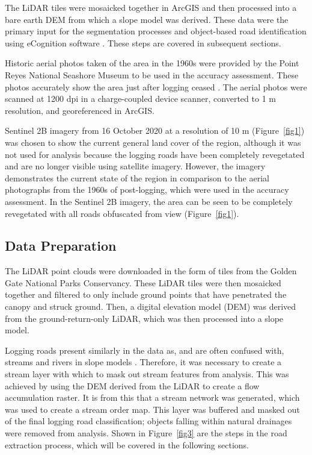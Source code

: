 \documentclass[remotesensing,article,accept,pdftex,moreauthors]{Definitions/mdpi}
\begin{document}
The LiDAR tiles were mosaicked together in ArcGIS \cite{esri} and then processed into a bare earth DEM from which a slope model was derived. These data were the primary input for the segmentation processes and object-based road identification using eCognition software \cite{ecog}. These steps are covered in subsequent sections.

Historic aerial photos taken of the area in the 1960s were provided by the Point Reyes National Seashore Museum to be used in the accuracy assessment. These photos accurately show the area just after logging ceased \cite{becker}. The aerial photos were scanned at 1200 dpi in a charge-coupled device scanner, converted to 1 m resolution, and georeferenced in ArcGIS. 

Sentinel 2B imagery from 16 October 2020 at a resolution of 10 m (Figure~\ref{fig1}) was chosen to show the current general land cover of the region, although it was not used for analysis because the logging roads have been completely revegetated and are no longer visible using satellite imagery. However, the imagery demonstrates the current state of the region in comparison to the aerial photographs from the 1960s of post-logging, which were used in the accuracy assessment. In the Sentinel 2B imagery, the area can be seen to be completely revegetated with all roads obfuscated from view (Figure~\ref{fig1}). 
\subsection{Data Preparation}

The LiDAR point clouds were downloaded in the form of tiles from the Golden Gate National Parks Conservancy. These LiDAR tiles were then mosaicked together and filtered to only include ground points that have penetrated the canopy and struck ground. Then, a digital elevation model (DEM) was derived from the ground-return-only LiDAR, which was then processed into a slope model.

Logging roads present similarly in the data as, and are often confused with, streams and rivers in slope models \cite{sherba}. Therefore, it was necessary to create a stream layer with which to mask out stream features from analysis. This was achieved by using the DEM derived from the LiDAR to create a flow accumulation raster. It is from this that a stream network was generated, which was used to create a stream order map. This layer was buffered and masked out of the final logging road classification; objects falling within natural drainages were removed from analysis. Shown in Figure~\ref{fig3} are the steps in the road extraction process, which will be covered in the following sections.
\end{document}
